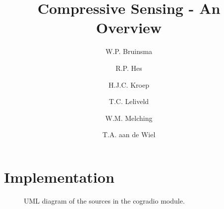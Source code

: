 \documentclass[a4paper, openany, oneside]{memoir}
\title{Compressive Sensing - An Overview}
\author{W.P. Bruinsma \and R.P. Hes \and H.J.C. Kroep \and T.C. Leliveld \and W.M. Melching \and T.A. aan de Wiel}
\begin{document}
\chapter{Implementation}

\begin{sidewaysfigure}[]
    \centering
    \resizebox{\textwidth}{!}{
        
    }
    \caption{UML diagram of the sources in the cogradio module.}
    \label{fig:name}
\end{sidewaysfigure}
\end{document}
